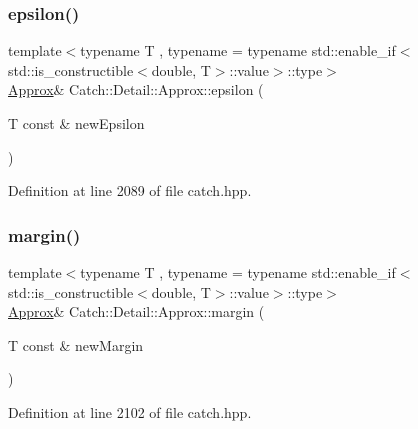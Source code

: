 \subsubsection{\texorpdfstring{epsilon()}{epsilon()}}
{\footnotesize\ttfamily template$<$typename T , typename  = typename std\+::enable\+\_\+if$<$std\+::is\+\_\+constructible$<$double, T$>$\+::value$>$\+::type$>$ \\
\mbox{\hyperlink{class_catch_1_1_detail_1_1_approx}{Approx}}\& Catch\+::\+Detail\+::\+Approx\+::epsilon (\begin{DoxyParamCaption}\item[{T const \&}]{new\+Epsilon }\end{DoxyParamCaption})\hspace{0.3cm}{\ttfamily [inline]}}



Definition at line 2089 of file catch.\+hpp.

\mbox{\label{class_catch_1_1_detail_1_1_approx_a6467dc18791e1a1f4c15c4fb63cf5051}} 
\subsubsection{\texorpdfstring{margin()}{margin()}}
{\footnotesize\ttfamily template$<$typename T , typename  = typename std\+::enable\+\_\+if$<$std\+::is\+\_\+constructible$<$double, T$>$\+::value$>$\+::type$>$ \\
\mbox{\hyperlink{class_catch_1_1_detail_1_1_approx}{Approx}}\& Catch\+::\+Detail\+::\+Approx\+::margin (\begin{DoxyParamCaption}\item[{T const \&}]{new\+Margin }\end{DoxyParamCaption})\hspace{0.3cm}{\ttfamily [inline]}}



Definition at line 2102 of file catch.\+hpp.

\mbox{\label{class_catch_1_1_detail_1_1_approx_ad8b2757f4804f9a1d3fa674efb98c20e}} 
